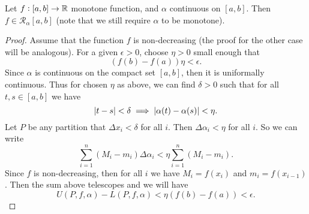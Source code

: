 \begin{proposition}
	Let $f:[a,b] \to \mathbb{R}$ monotone function, and $\alpha$ continuous on $[a,b]$. Then $f \in \mathcal{R}_\alpha[a,b]$ (note that we still require $\alpha$ to be monotone). 
\end{proposition}
\begin{proof}
	Assume that the function $f$ is non-decreasing (the proof for the other case will be analogous). For a given $\epsilon>0$, choose $\eta>0$ small enough that
	\[ (f(b) - f(a))\eta < \epsilon. \]
	Since $\alpha$ is continuous on the compact set $[a,b]$, then it is uniformally continuous. Thus for chosen $\eta$ as above, we can find $\delta>0$ such that for all $t,s \in [a,b]$ we have
	\[ |t-s| < \delta \implies |\alpha(t) - \alpha(s)| < \eta. \]
	Let $P$ be any partition that $\Delta x_i < \delta$ for all $i$. Then $\Delta \alpha_i < \eta$ for all $i$. So we can write
	\[ \sum_{i=1}^{n} (M_i - m_i)\Delta\alpha_i < \eta \sum_{i=1}^{n} (M_i - m_i). \]
	Since $f$ is non-decreasing, then for all $i$ we have $M_i = f(x_i)$ and $m_i = f(x_{i-1})$. Then the sum above telescopes and we will have
	\[ U(P,f,\alpha) - L(P,f,\alpha) < \eta (f(b) - f(a)) < \epsilon. \]
\end{proof}
